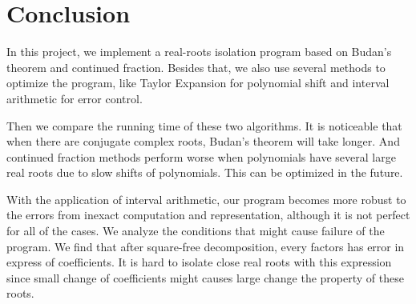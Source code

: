 \section{Conclusion} \label{conclusion}

In this project, we implement a real-roots isolation program based on
Budan’s theorem and continued fraction. Besides that, we also use several
methods to optimize the program, like Taylor Expansion for polynomial shift and
interval arithmetic for error control.

Then we compare the running time of these two algorithms. It is noticeable that
when there are conjugate complex roots, Budan’s theorem will take longer. And
continued fraction methods perform worse when polynomials have several large
real roots due to slow shifts of polynomials. This can be optimized in the
future.

With the application of interval arithmetic, our program becomes more robust to
the errors from inexact computation and representation, although it is not
perfect for all of the cases. We analyze the conditions that might
cause failure of the program. We find that after square-free decomposition,
every factors has error in express of coefficients. It is hard to isolate close
real roots with this expression since small change of coefficients might causes
large change the property of these roots.


